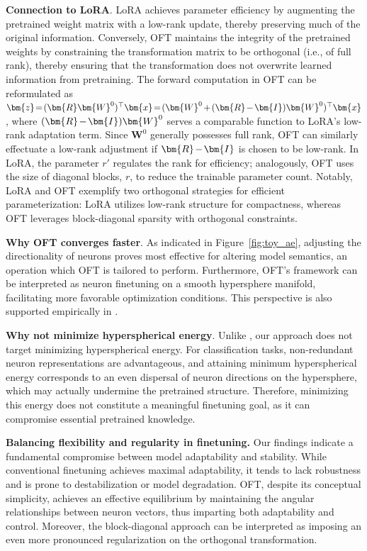 {\textbf{Connection to LoRA}. LoRA achieves parameter efficiency by augmenting the pretrained weight matrix with a low-rank update, thereby preserving much of the original information. Conversely, OFT maintains the integrity of the pretrained weights by constraining the transformation matrix to be orthogonal (i.e., of full rank), thereby ensuring that the transformation does not overwrite learned information from pretraining. The forward computation in OFT can be reformulated as $\thickmuskip=2mu \medmuskip=2mu \bm{z}=(\bm{R}\bm{W}^0)^\top\bm{x}=(\bm{W}^0+(\bm{R}-\bm{I})\bm{W}^0)^\top\bm{x}$, where $\thickmuskip=2mu \medmuskip=2mu (\bm{R}-\bm{I})\bm{W}^0$ serves a comparable function to LoRA’s low-rank adaptation term. Since $\bm{W}^0$ generally possesses full rank, OFT can similarly effectuate a low-rank adjustment if $\thickmuskip=2mu \medmuskip=2mu \bm{R}-\bm{I}$ is chosen to be low-rank. In LoRA, the parameter $r'$ regulates the rank for efficiency; analogously, OFT uses the size of diagonal blocks, $r$, to reduce the trainable parameter count. Notably, LoRA and OFT exemplify two orthogonal strategies for efficient parameterization: LoRA utilizes low-rank structure for compactness, whereas OFT leverages block-diagonal sparsity with orthogonal constraints.

\textbf{Why OFT converges faster}. As indicated in Figure~\ref{fig:toy_ae}, adjusting the directionality of neurons proves most effective for altering model semantics, an operation which OFT is tailored to perform. Furthermore, OFT’s framework can be interpreted as neuron finetuning on a smooth hypersphere manifold, facilitating more favorable optimization conditions. This perspective is also supported empirically in \cite{liu2021orthogonal}.

\textbf{Why not minimize hyperspherical energy}. Unlike \cite{liu2021orthogonal}, our approach does not target minimizing hyperspherical energy. For classification tasks, non-redundant neuron representations are advantageous, and attaining minimum hyperspherical energy corresponds to an even dispersal of neuron directions on the hypersphere, which may actually undermine the pretrained structure. Therefore, minimizing this energy does not constitute a meaningful finetuning goal, as it can compromise essential pretrained knowledge.

\textbf{Balancing flexibility and regularity in finetuning.} Our findings indicate a fundamental compromise between model adaptability and stability. While conventional finetuning achieves maximal adaptability, it tends to lack robustness and is prone to destabilization or model degradation. OFT, despite its conceptual simplicity, achieves an effective equilibrium by maintaining the angular relationships between neuron vectors, thus imparting both adaptability and control. Moreover, the block-diagonal approach can be interpreted as imposing an even more pronounced regularization on the orthogonal transformation.

}
